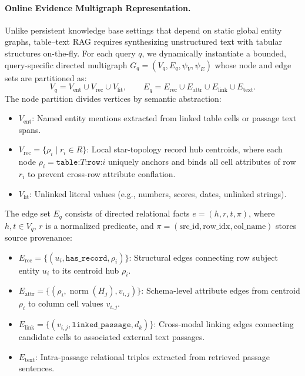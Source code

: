 \documentclass[runningheads]{llncs}
\begin{document}
\paragraph{Online Evidence Multigraph Representation.}
Unlike persistent knowledge base settings that depend on static global entity graphs, table--text RAG requires synthesizing unstructured text with tabular structures on-the-fly. For each query $q$, we dynamically instantiate a bounded, query-specific directed multigraph $G_q = (V_q, E_q, \psi_V, \psi_E)$ whose node and edge sets are partitioned as:
\begin{equation}
\label{eq:graph-partition}
V_q = V_{\text{ent}} \cup V_{\text{rec}} \cup V_{\text{lit}}, \qquad
E_q = E_{\text{rec}} \cup E_{\text{attr}} \cup E_{\text{link}} \cup E_{\text{text}}.
\end{equation}
The node partition divides vertices by semantic abstraction:
\begin{itemize}[leftmargin=1.5em]
    \item $V_{\text{ent}}$: Named entity mentions extracted from linked table cells or passage text spans.
    \item $V_{\text{rec}} = \{\rho_i \mid r_i \in R\}$: Local star-topology record hub centroids, where each node $\rho_i = \texttt{table:}T\texttt{:row:}i$ uniquely anchors and binds all cell attributes of row $r_i$ to prevent cross-row attribute conflation.
    \item $V_{\text{lit}}$: Unlinked literal values (e.g., numbers, scores, dates, unlinked strings).
\end{itemize}
The edge set $E_q$ consists of directed relational facts $e = (h, r, t, \pi)$, where $h, t \in V_q$, $r$ is a normalized predicate, and $\pi = (\text{src\_id}, \text{row\_idx}, \text{col\_name})$ stores source provenance:
\begin{itemize}[leftmargin=1.5em]
    \item $E_{\text{rec}} = \{ (u_i, \texttt{has\_record}, \rho_i) \}$: Structural edges connecting row subject entity $u_i$ to its centroid hub $\rho_i$.
    \item $E_{\text{attr}} = \{ (\rho_i, \operatorname{norm}(H_j), v_{i,j}) \}$: Schema-level attribute edges from centroid $\rho_i$ to column cell values $v_{i,j}$.
    \item $E_{\text{link}} = \{ (v_{i,j}, \texttt{linked\_passage}, d_k) \}$: Cross-modal linking edges connecting candidate cells to associated external text passages.
    \item $E_{\text{text}}$: Intra-passage relational triples extracted from retrieved passage sentences.
\end{itemize}
\end{document}
